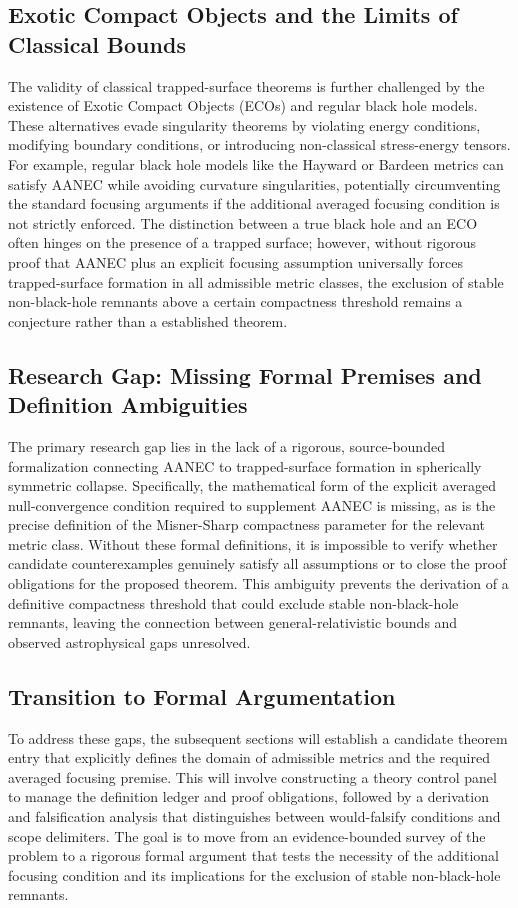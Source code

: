 \documentclass[conference]{IEEEtran}
\begin{document}
\subsection{Exotic Compact Objects and the Limits of Classical Bounds}
The validity of classical trapped-surface theorems is further challenged by the existence of Exotic Compact Objects (ECOs) and regular black hole models. These alternatives evade singularity theorems by violating energy conditions, modifying boundary conditions, or introducing non-classical stress-energy tensors. For example, regular black hole models like the Hayward or Bardeen metrics can satisfy AANEC while avoiding curvature singularities, potentially circumventing the standard focusing arguments if the additional averaged focusing condition is not strictly enforced. The distinction between a true black hole and an ECO often hinges on the presence of a trapped surface; however, without rigorous proof that AANEC plus an explicit focusing assumption universally forces trapped-surface formation in all admissible metric classes, the exclusion of stable non-black-hole remnants above a certain compactness threshold remains a conjecture rather than a established theorem.~\cite{cite_37ecbded9d629353}

\subsection{Research Gap: Missing Formal Premises and Definition Ambiguities}
The primary research gap lies in the lack of a rigorous, source-bounded formalization connecting AANEC to trapped-surface formation in spherically symmetric collapse. Specifically, the mathematical form of the explicit averaged null-convergence condition required to supplement AANEC is missing, as is the precise definition of the Misner-Sharp compactness parameter for the relevant metric class. Without these formal definitions, it is impossible to verify whether candidate counterexamples genuinely satisfy all assumptions or to close the proof obligations for the proposed theorem. This ambiguity prevents the derivation of a definitive compactness threshold that could exclude stable non-black-hole remnants, leaving the connection between general-relativistic bounds and observed astrophysical gaps unresolved.

\subsection{Transition to Formal Argumentation}
To address these gaps, the subsequent sections will establish a candidate theorem entry that explicitly defines the domain of admissible metrics and the required averaged focusing premise. This will involve constructing a theory control panel to manage the definition ledger and proof obligations, followed by a derivation and falsification analysis that distinguishes between would-falsify conditions and scope delimiters. The goal is to move from an evidence-bounded survey of the problem to a rigorous formal argument that tests the necessity of the additional focusing condition and its implications for the exclusion of stable non-black-hole remnants.
\end{document}
